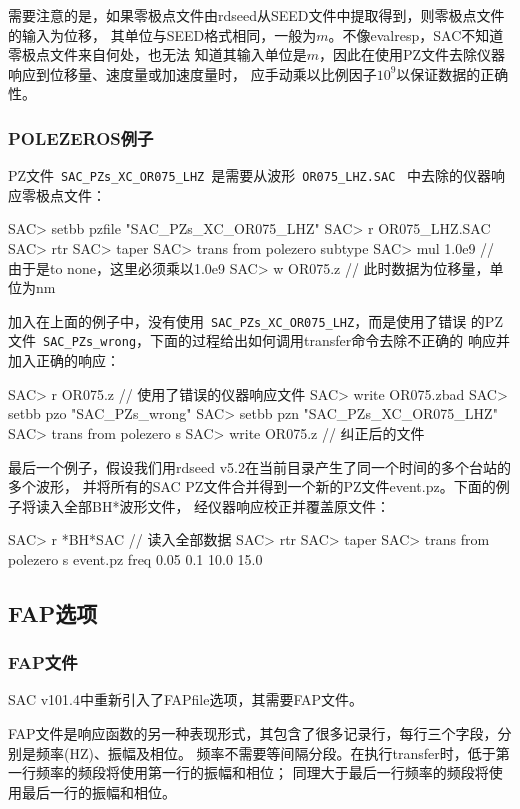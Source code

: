 需要注意的是，如果零极点文件由rdseed从SEED文件中提取得到，则零极点文件的输入为位移，
其单位与SEED格式相同，一般为$m$。不像evalresp，SAC不知道零极点文件来自何处，也无法
知道其输入单位是$m$，因此在使用PZ文件去除仪器响应到位移量、速度量或加速度量时，
应手动乘以比例因子$10^9$以保证数据的正确性。

\subsubsection{POLEZEROS例子}
PZ文件~\lstinline{SAC_PZs_XC_OR075_LHZ}~是需要从波形~\lstinline{OR075_LHZ.SAC}~
中去除的仪器响应零极点文件：
\begin{SACCode}
SAC> setbb pzfile "SAC_PZs_XC_OR075_LHZ"
SAC> r OR075_LHZ.SAC
SAC> rtr
SAC> taper
SAC> trans from polezero subtype %
SAC> mul 1.0e9          // 由于是to none，这里必须乘以1.0e9
SAC> w OR075.z          // 此时数据为位移量，单位为nm
\end{SACCode}

加入在上面的例子中，没有使用~\lstinline{SAC_PZs_XC_OR075_LHZ}，而是使用了错误
的PZ文件~\lstinline{SAC_PZs_wrong}，下面的过程给出如何调用transfer命令去除不正确的
响应并加入正确的响应：
\begin{SACCode}
SAC> r OR075.z                  // 使用了错误的仪器响应文件
SAC> write OR075.zbad
SAC> setbb pzo "SAC_PZs_wrong"
SAC> setbb pzn "SAC_PZs_XC_OR075_LHZ"
SAC> trans from polezero s %
SAC> write OR075.z              // 纠正后的文件
\end{SACCode}

最后一个例子，假设我们用rdseed v5.2在当前目录产生了同一个时间的多个台站的多个波形，
并将所有的SAC PZ文件合并得到一个新的PZ文件event.pz。下面的例子将读入全部BH*波形文件，
经仪器响应校正并覆盖原文件：
\begin{SACCode}
SAC> r *BH*SAC          // 读入全部数据
SAC> rtr
SAC> taper
SAC> trans from polezero s event.pz freq 0.05 0.1 10.0 15.0
\end{SACCode}

\subsection{FAP选项}
\subsubsection{FAP文件}
SAC v101.4中重新引入了FAPfile选项，其需要FAP文件。

FAP文件是响应函数的另一种表现形式，其包含了很多记录行，每行三个字段，分别是频率(HZ)、振幅及相位。
频率不需要等间隔分段。在执行transfer时，低于第一行频率的频段将使用第一行的振幅和相位；
同理大于最后一行频率的频段将使用最后一行的振幅和相位。

